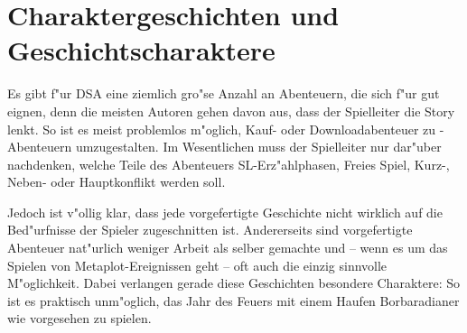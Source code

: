 \section{Charaktergeschichten und Geschichtscharaktere}
Es gibt f"ur DSA eine ziemlich gro"se Anzahl an Abenteuern, die sich f"ur \StoryDSA gut eignen, denn die meisten Autoren gehen davon aus, dass der Spielleiter die Story lenkt. So ist es meist problemlos m"oglich, Kauf- oder Downloadabenteuer zu \StoryDSA-Abenteuern umzugestalten. Im Wesentlichen muss der Spielleiter nur dar"uber nachdenken, welche Teile des Abenteuers SL-Erz"ahlphasen, Freies Spiel, Kurz-, Neben- oder Hauptkonflikt werden soll.

Jedoch ist v"ollig klar, dass jede vorgefertigte Geschichte nicht wirklich auf die Bed"urfnisse der Spieler zugeschnitten ist. Andererseits sind vorgefertigte Abenteuer nat"urlich weniger Arbeit als selber gemachte und -- wenn es um das Spielen von Metaplot-Ereignissen geht -- oft auch die einzig sinnvolle M"oglichkeit. Dabei verlangen gerade diese Geschichten besondere Charaktere: So ist es praktisch unm"oglich, das Jahr des Feuers mit einem Haufen Borbaradianer wie vorgesehen zu spielen.

